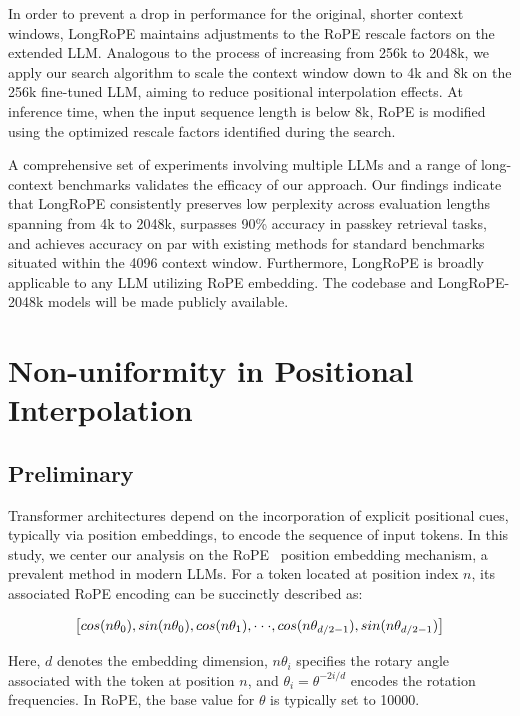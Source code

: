 In order to prevent a drop in performance for the original, shorter context windows, {LongRoPE} maintains adjustments to the RoPE rescale factors on the extended LLM. Analogous to the process of increasing from 256k to 2048k, we apply our search algorithm to scale the context window down to 4k and 8k on the 256k fine-tuned LLM, aiming to reduce positional interpolation effects. At inference time, when the input sequence length is below 8k, RoPE is modified using the optimized rescale factors identified during the search.

A comprehensive set of experiments involving multiple LLMs and a range of long-context benchmarks validates the efficacy of our approach. Our findings indicate that LongRoPE consistently preserves low perplexity across evaluation lengths spanning from 4k to 2048k, surpasses 90\% accuracy in passkey retrieval tasks, and achieves accuracy on par with existing methods for standard benchmarks situated within the 4096 context window. Furthermore, LongRoPE is broadly applicable to any LLM utilizing RoPE embedding. The codebase and LongRoPE-2048k models will be made publicly available.

\section{Non-uniformity in Positional Interpolation}
\label{sec:analysis}

\subsection{Preliminary}

Transformer architectures depend on the incorporation of explicit positional cues, typically via position embeddings, to encode the sequence of input tokens. In this study, we center our analysis on the RoPE~\cite{rope} position embedding mechanism, a prevalent method in modern LLMs. For a token located at position index $n$, its associated RoPE encoding can be succinctly described as:

\begin{equation}
		\fontsize{7.8}{7.8} \selectfont
	\label{eq:rope}
	\left[ cos(n\theta_0), sin(n\theta_0), cos(n\theta_1), \cdot\cdot\cdot, cos(n\theta_{d/2-1}), sin(n\theta_{d/2-1}) \right]   
\end{equation}

Here, $d$ denotes the embedding dimension, 
$n\theta_i$ specifies the rotary angle associated with the token at position $n$,
and $\theta_i=\theta^{-2i/d}$ encodes the rotation frequencies. In RoPE, the base value for $\theta$ is typically set to 10000.

